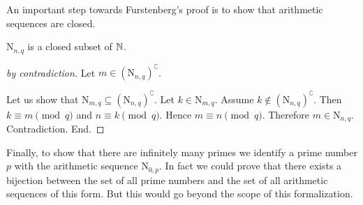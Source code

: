 \documentclass{article}
\newcommand{\N}{\mathrm{N}}
\begin{document}
  An important step towards Furstenberg's proof is to show that arithmetic
  sequences are closed.

  \begin{forthel}
    \begin{lemma}
      $\N_{n, q}$ is a closed subset of $\mathbb{N}$.
    \end{lemma}
    \begin{proof}[by contradiction]
      Let $m \in (\N_{n, q})^{\complement}$.

      Let us show that $\N_{m, q} \subseteq (\N_{n, q})^{\complement}$.
        Let $k \in \N_{m, q}$.
        Assume $k \notin (\N_{n, q})^{\complement}$.
        Then $k \equiv m \pmod{q}$ and $n \equiv k \pmod{q}$.
        Hence $m \equiv n \pmod{q}$.
        Therefore $m \in \N_{n, q}$.
        Contradiction.
      End.
    \end{proof}
  \end{forthel}

  Finally, to show that there are infinitely many primes we identify a prime
  number $p$ with the arithmetic sequence $\N_{0, p}$.
  In fact we could prove that there exists a bijection between the set of all
  prime numbers and the set of all arithmetic sequences of this form.
  But this would go beyond the scope of this formalization.
\end{document}
